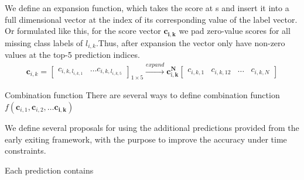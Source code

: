\begin{enumdescript}
\begin{enumdescript}
		We define an expansion function, which takes the score at s and insert it into a full dimensional vector at the index of its corresponding value of the label vector. Or formulated like this, for the score vector $\mathbf{c_{i,k}}$ we pad zero-value scores for all missing class labels of $ l_{i,k} $.Thus, after expansion the vector only have non-zero values at the top-5 prediction indices.
		\begin{align*}
		\mathbf{c}_{i,k} = 
		\begin{bmatrix}
		c_{i,k,l_{i,k,1}} & \dots c_{i,k,l_{i,k,5}}
		\end{bmatrix}_{1 \times 5} 
		\xrightarrow{expand}
		\mathbf{c^{N}_{î,k}}
		\begin{bmatrix}
		c_{i,k,1} & c_{i,k,12} & \dots & c_{i,k,N}
		\end{bmatrix} 
		\end{align*}
		\begin{enumdescript}
			\item[Combination function] There are several ways to define combination function $ f\left(\mathbf{c}_{i,1}, \mathbf{c}_{i,2}, \dots \mathbf{c_{i,k}}\right) $
		\end{enumdescript}
	\end{enumdescript}
\end{enumdescript} 

We define several proposals for using the additional predictions provided from the early exiting framework, with the purpose to improve the accuracy under time constraints. 

Each prediction contains 


